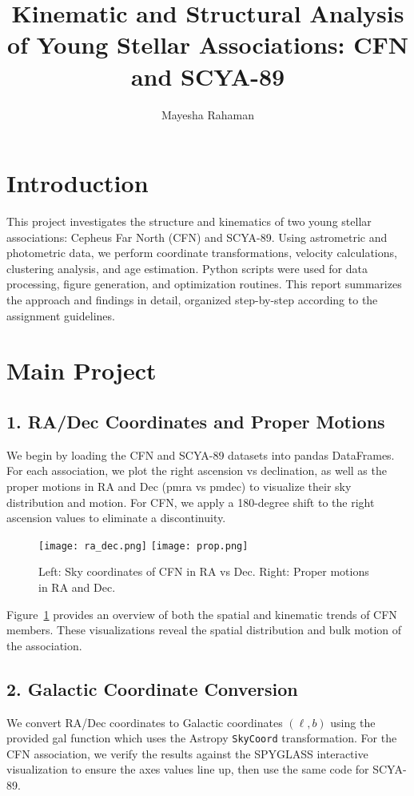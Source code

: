 \documentclass[11pt]{article}
\title{Kinematic and Structural Analysis of Young Stellar Associations: CFN and SCYA-89}
\author{Mayesha Rahaman}
\date{}
\begin{document}
\maketitle

\section*{Introduction}
This project investigates the structure and kinematics of two young stellar associations: Cepheus Far North (CFN) and SCYA-89. Using astrometric and photometric data, we perform coordinate transformations, velocity calculations, clustering analysis, and age estimation. Python scripts were used for data processing, figure generation, and optimization routines. This report summarizes the approach and findings in detail, organized step-by-step according to the assignment guidelines.

\section*{Main Project}

\subsection*{1. RA/Dec Coordinates and Proper Motions}
We begin by loading the CFN and SCYA-89 datasets into pandas DataFrames. For each association, we plot the right ascension vs declination, as well as the proper motions in RA and Dec (pmra vs pmdec) to visualize their sky distribution and motion. For CFN, we apply a 180-degree shift to the right ascension values to eliminate a discontinuity.

\begin{figure}[H]
    \centering
    \texttt{[image: ra\_dec.png]}
    \texttt{[image: prop.png]}
    \caption{Left: Sky coordinates of CFN in RA vs Dec. Right: Proper motions in RA and Dec.}
    \label{fig:radec_pm}
\end{figure}

Figure~\ref{fig:radec_pm} provides an overview of both the spatial and kinematic trends of CFN members. These visualizations reveal the spatial distribution and bulk motion of the association.


\subsection*{2. Galactic Coordinate Conversion}
We convert RA/Dec coordinates to Galactic coordinates $(\ell, b)$ using the provided gal function which uses the Astropy \texttt{SkyCoord} transformation. For the CFN association, we verify the results against the SPYGLASS interactive visualization to ensure the axes values line up, then use the same code for SCYA-89. 
\end{document}
